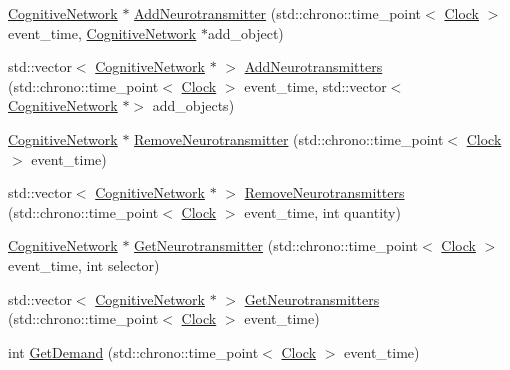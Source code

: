 \begin{DoxyCompactItemize}
\item 
\mbox{\hyperlink{classCognitiveNetwork}{Cognitive\+Network}} $\ast$ \mbox{\hyperlink{classInterneuronSpace_afee7374310b2a8c08bac232d62ea7aa1}{Add\+Neurotransmitter}} (std\+::chrono\+::time\+\_\+point$<$ \mbox{\hyperlink{universe_8h_a0ef8d951d1ca5ab3cfaf7ab4c7a6fd80}{Clock}} $>$ event\+\_\+time, \mbox{\hyperlink{classCognitiveNetwork}{Cognitive\+Network}} $\ast$add\+\_\+object)
\item 
std\+::vector$<$ \mbox{\hyperlink{classCognitiveNetwork}{Cognitive\+Network}} $\ast$ $>$ \mbox{\hyperlink{classInterneuronSpace_a1049397cd511c753d8c178db8f68a1a7}{Add\+Neurotransmitters}} (std\+::chrono\+::time\+\_\+point$<$ \mbox{\hyperlink{universe_8h_a0ef8d951d1ca5ab3cfaf7ab4c7a6fd80}{Clock}} $>$ event\+\_\+time, std\+::vector$<$ \mbox{\hyperlink{classCognitiveNetwork}{Cognitive\+Network}} $\ast$$>$ add\+\_\+objects)
\item 
\mbox{\hyperlink{classCognitiveNetwork}{Cognitive\+Network}} $\ast$ \mbox{\hyperlink{classInterneuronSpace_aa46b5ce238b49425a68fcfd53ba1d8b7}{Remove\+Neurotransmitter}} (std\+::chrono\+::time\+\_\+point$<$ \mbox{\hyperlink{universe_8h_a0ef8d951d1ca5ab3cfaf7ab4c7a6fd80}{Clock}} $>$ event\+\_\+time)
\item 
std\+::vector$<$ \mbox{\hyperlink{classCognitiveNetwork}{Cognitive\+Network}} $\ast$ $>$ \mbox{\hyperlink{classInterneuronSpace_a7b11f542ab7a3d293d5fcf5a1b522ac2}{Remove\+Neurotransmitters}} (std\+::chrono\+::time\+\_\+point$<$ \mbox{\hyperlink{universe_8h_a0ef8d951d1ca5ab3cfaf7ab4c7a6fd80}{Clock}} $>$ event\+\_\+time, int quantity)
\item 
\mbox{\hyperlink{classCognitiveNetwork}{Cognitive\+Network}} $\ast$ \mbox{\hyperlink{classInterneuronSpace_a7a60c95c8706cbff3084e74b7b15d75c}{Get\+Neurotransmitter}} (std\+::chrono\+::time\+\_\+point$<$ \mbox{\hyperlink{universe_8h_a0ef8d951d1ca5ab3cfaf7ab4c7a6fd80}{Clock}} $>$ event\+\_\+time, int selector)
\item 
std\+::vector$<$ \mbox{\hyperlink{classCognitiveNetwork}{Cognitive\+Network}} $\ast$ $>$ \mbox{\hyperlink{classInterneuronSpace_aaae45b76a4c059aae1e27bde3901371c}{Get\+Neurotransmitters}} (std\+::chrono\+::time\+\_\+point$<$ \mbox{\hyperlink{universe_8h_a0ef8d951d1ca5ab3cfaf7ab4c7a6fd80}{Clock}} $>$ event\+\_\+time)
\item 
int \mbox{\hyperlink{classInterneuronSpace_ae62237c3a84893c81e9998602ab16718}{Get\+Demand}} (std\+::chrono\+::time\+\_\+point$<$ \mbox{\hyperlink{universe_8h_a0ef8d951d1ca5ab3cfaf7ab4c7a6fd80}{Clock}} $>$ event\+\_\+time)
$$
\end{DoxyCompactItemize}
